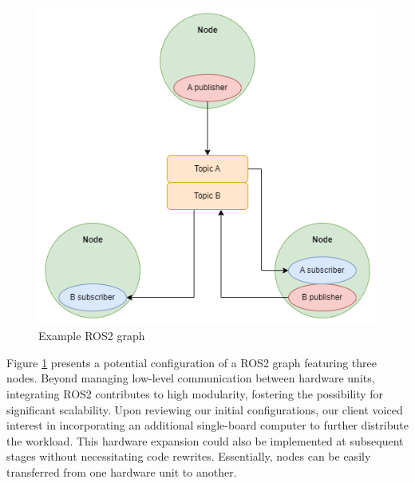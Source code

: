 
\begin{figure}[H]
    \centering
    \includegraphics[scale=0.5]{a_martinbilder/ros_graph_example.png}
    \caption{Example ROS2 graph}
    \label{fig:ros_graph_example}
\end{figure}
Figure \ref{fig:ros_graph_example} presents a potential configuration of a ROS2 graph featuring three nodes. Beyond managing low-level communication between hardware units, integrating ROS2 contributes to high modularity, fostering the possibility for significant scalability. Upon reviewing our initial configurations, our client voiced interest in incorporating an additional single-board computer to further distribute the workload. This hardware expansion could also be implemented at subsequent stages without necessitating code rewrites. Essentially, nodes can be easily transferred from one hardware unit to another.\\

